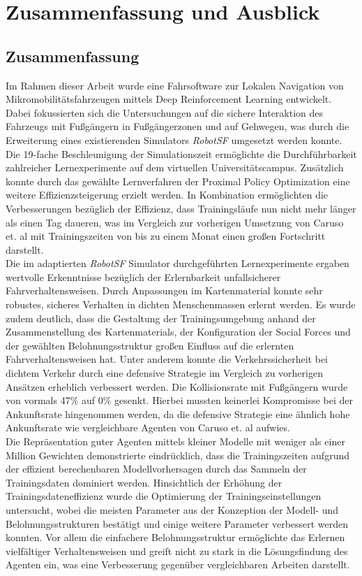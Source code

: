 
\cleardoublepage
\chapter{Zusammenfassung und Ausblick}\label{ch:Summary}

\section{Zusammenfassung}
Im Rahmen dieser Arbeit wurde eine Fahrsoftware zur Lokalen Navigation
von Mikromobilitätsfahrzeugen mittels Deep Reinforcement Learning entwickelt.
Dabei fokussierten sich die Untersuchungen auf die sichere Interaktion des Fahrzeugs
mit Fußgängern in Fußgängerzonen und auf Gehwegen, was durch die Erweiterung eines
existierenden Simulators \emph{RobotSF} umgesetzt werden konnte. Die 19-fache
Beschleunigung der Simulationszeit ermöglichte die Durchführbarkeit zahlreicher
Lernexperimente auf dem virtuellen Universitätscampus. Zusätzlich konnte durch das
gewählte Lernverfahren der Proximal Policy Optimization eine weitere Effizienzsteigerung
erzielt werden. In Kombination ermöglichten die Verbesserungen bezüglich der Effizienz,
dass Trainingsläufe nun nicht mehr länger als einen Tag daueren, was im Vergleich zur
vorherigen Umsetzung von Caruso et. al mit Trainingszeiten von bis zu einem Monat einen
großen Fortschritt darstellt.\\

Die im adaptierten \emph{RobotSF} Simulator durchgeführten Lernexperimente ergaben
wertvolle Erkenntnisse bezüglich der Erlernbarkeit unfallsicherer Fahrverhaltensweisen.
Durch Anpassungen im Kartenmaterial konnte sehr robustes, sicheres Verhalten in dichten
Menschenmassen erlernt werden. Es wurde zudem deutlich, dass die Gestaltung der Trainingsumgebung
anhand der Zusammenstellung des Kartenmaterials, der Konfiguration der Social Forces und
der gewählten Belohnungsstruktur großen Einfluss auf die erlernten Fahrverhaltensweisen hat.
Unter anderem konnte die Verkehrssicherheit bei dichtem Verkehr durch eine defensive Strategie
im Vergleich zu vorherigen Ansätzen erheblich verbessert werden. Die Kollisionsrate mit Fußgängern
wurde von vormals 47\% auf 0\% gesenkt. Hierbei mussten keinerlei Kompromisse bei der
Ankunftsrate hingenommen werden, da die defensive Strategie eine ähnlich hohe Ankunftsrate
wie vergleichbare Agenten von Caruso et. al aufwies.\\

Die Repräsentation guter Agenten mittels kleiner Modelle mit weniger als einer Million Gewichten
demonstrierte eindrücklich, dass die Trainingszeiten aufgrund der effizient berechenbaren
Modellvorhersagen durch das Sammeln der Trainingsdaten dominiert werden. Hinsichtlich der
Erhöhung der Trainingsdateneffizienz wurde die Optimierung der Trainingseinstellungen
untersucht, wobei die meisten Parameter aus der Konzeption der Modell- und Belohnungsstrukturen
bestätigt und einige weitere Parameter verbessert werden konnten.
Vor allem die einfachere Belohnungsstruktur ermöglichte das Erlernen vielfältiger
Verhaltensweisen und greift nicht zu stark in die Lösungsfindung des Agenten ein, was eine
Verbesserung gegenüber vergleichbaren Arbeiten darstellt.\\

